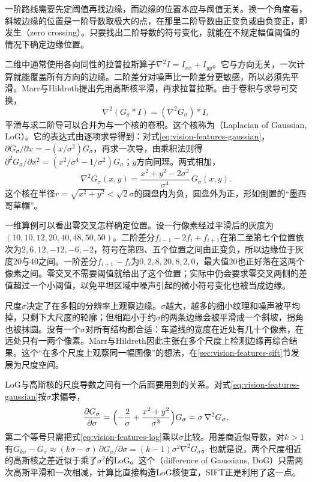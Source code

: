一阶路线需要先定阈值再找边缘，而边缘的位置本应与阈值无关。换一个角度看，斜坡边缘的位置是一阶导数取极大的点，在那里二阶导数由正变负或由负变正，即发生（zero crossing）。只要找出二阶导数的符号变化，就能在不规定幅值阈值的情况下确定边缘位置。

二维中通常使用各向同性的拉普拉斯算子$\nabla^2I=I_{xx}+I_{yy}$。它与方向无关，一次计算就能覆盖所有方向的边缘。二阶差分对噪声比一阶差分更敏感，所以必须先平滑。Marr与Hildreth提出先用高斯核平滑，再求拉普拉斯。由于卷积与求导可交换，
\[
  \nabla^2(G_{\sigma}*I)=(\nabla^2G_{\sigma})*I,
\]
平滑与求二阶导可以合并为与一个核的卷积。这个核称为（Laplacian of Gaussian, LoG）。它的表达式由逐项求导得到：对式\eqref{eq:vision-features-gaussian}，$\partial G_{\sigma}/\partial x=-(x/\sigma^2)G_{\sigma}$，再求一次导，由乘积法则得$\partial^2G_{\sigma}/\partial x^2=(x^2/\sigma^4-1/\sigma^2)G_{\sigma}$；$y$方向同理。两式相加，
\begin{equation}
  \nabla^2G_{\sigma}(x,y)=\frac{x^2+y^2-2\sigma^2}{\sigma^4}\,G_{\sigma}(x,y).
  \label{eq:vision-features-log}
\end{equation}
这个核在半径$r=\sqrt{x^2+y^2}<\sqrt2\sigma$的圆盘内为负，圆盘外为正，形如倒置的“墨西哥草帽”。

一维算例可以看出零交叉怎样确定位置。设一行像素经过平滑后的灰度为$(10,10,12,20,40,48,50,50)$。二阶差分$f_{i-1}-2f_i+f_{i+1}$在第二至第七个位置依次为$2,6,12,-12,-6,-2$，符号在第四、五个位置之间由正变负，所以边缘位于灰度$20$与$40$之间。一阶差分$f_{i+1}-f_i$为$0,2,8,20,8,2,0$，最大值$20$也正好落在这两个像素之间。零交叉不需要阈值就给出了这个位置；实际中仍会要求零交叉两侧的差值超过一个小阈值，以免平坦区域中噪声引起的微小符号变化也被当成边缘。

尺度$\sigma$决定了在多粗的分辨率上观察边缘。$\sigma$越大，越多的细小纹理和噪声被平均掉，只剩下大尺度的轮廓；但相距小于约$\sigma$的两条边缘会被平滑成一个斜坡，拐角也被抹圆。没有一个$\sigma$对所有结构都合适：车道线的宽度在近处有几十个像素，在远处只有一两个像素。Marr与Hildreth因此主张在多个尺度上检测边缘再综合结果。这个“在多个尺度上观察同一幅图像”的想法，在\ref{sec:vision-features-sift}节发展为尺度空间。

LoG与高斯核的尺度导数之间有一个后面要用到的关系。对式\eqref{eq:vision-features-gaussian}按$\sigma$求偏导，
\[
  \frac{\partial G_{\sigma}}{\partial\sigma}
  =\Bigl(-\frac{2}{\sigma}+\frac{x^2+y^2}{\sigma^3}\Bigr)G_{\sigma}
  =\sigma\,\nabla^2G_{\sigma},
\]
第二个等号只需把式\eqref{eq:vision-features-log}乘以$\sigma$比较。用差商近似导数，对$k>1$有$G_{k\sigma}-G_{\sigma}\approx(k\sigma-\sigma)\,\partial G_{\sigma}/\partial\sigma=(k-1)\sigma^2\nabla^2G_{\sigma}$。也就是说，两个尺度相近的高斯核之差近似于乘了$\sigma^2$的LoG。这个（difference of Gaussians, DoG）只需两次高斯平滑和一次相减，计算比直接构造LoG核便宜，SIFT正是利用了这一点。

